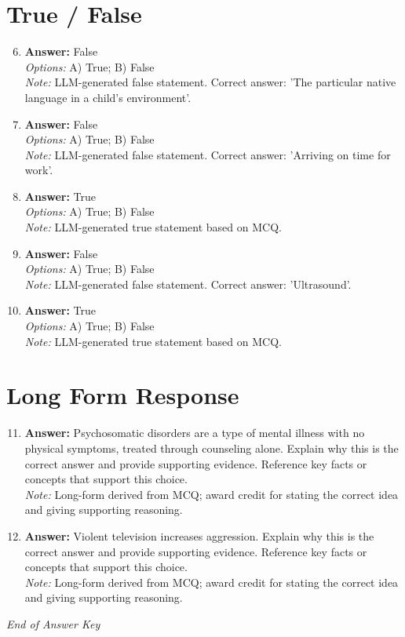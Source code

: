 \documentclass[12pt]{article}
\begin{document}
\section*{True / False}
\begin{enumerate}[label=\arabic*.]
\setcounter{enumi}{5}
\item \textbf{Answer:} False
\\ \textit{Options:} A) True; B) False
\\ \textit{Note:} LLM-generated false statement. Correct answer: 'The particular native language in a child's environment'.
\item \textbf{Answer:} False
\\ \textit{Options:} A) True; B) False
\\ \textit{Note:} LLM-generated false statement. Correct answer: 'Arriving on time for work'.
\item \textbf{Answer:} True
\\ \textit{Options:} A) True; B) False
\\ \textit{Note:} LLM-generated true statement based on MCQ.
\item \textbf{Answer:} False
\\ \textit{Options:} A) True; B) False
\\ \textit{Note:} LLM-generated false statement. Correct answer: 'Ultrasound'.
\item \textbf{Answer:} True
\\ \textit{Options:} A) True; B) False
\\ \textit{Note:} LLM-generated true statement based on MCQ.
\end{enumerate}

\section*{Long Form Response}
\begin{enumerate}[label=\arabic*.]
\setcounter{enumi}{10}
\item \textbf{Answer:} Psychosomatic disorders are a type of mental illness with no physical symptoms, treated through counseling alone. Explain why this is the correct answer and provide supporting evidence. Reference key facts or concepts that support this choice.
\\ \textit{Note:} Long-form derived from MCQ; award credit for stating the correct idea and giving supporting reasoning.
\item \textbf{Answer:} Violent television increases aggression. Explain why this is the correct answer and provide supporting evidence. Reference key facts or concepts that support this choice.
\\ \textit{Note:} Long-form derived from MCQ; award credit for stating the correct idea and giving supporting reasoning.
\end{enumerate}

\vfill
\noindent\textit{End of Answer Key}
\end{document}
